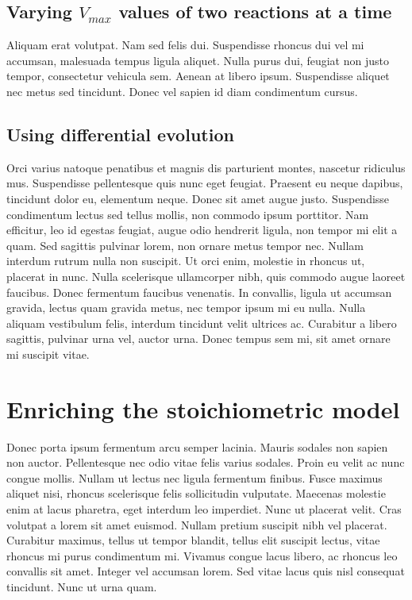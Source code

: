 \documentclass[parskip=full]{scrreprt}
\begin{document}
\section{Varying $V_{max}$ values of two reactions at a time}
\label{sec:couples}

Aliquam erat volutpat. Nam sed felis dui. Suspendisse rhoncus dui vel mi accumsan, malesuada tempus ligula aliquet. Nulla purus dui, feugiat non justo tempor, consectetur vehicula sem. Aenean at libero ipsum. Suspendisse aliquet nec metus sed tincidunt. Donec vel sapien id diam condimentum cursus.

\section{Using differential evolution}
\label{sec:de}

Orci varius natoque penatibus et magnis dis parturient montes, nascetur ridiculus mus. Suspendisse pellentesque quis nunc eget feugiat. Praesent eu neque dapibus, tincidunt dolor eu, elementum neque. Donec sit amet augue justo. Suspendisse condimentum lectus sed tellus mollis, non commodo ipsum porttitor. Nam efficitur, leo id egestas feugiat, augue odio hendrerit ligula, non tempor mi elit a quam. Sed sagittis pulvinar lorem, non ornare metus tempor nec. Nullam interdum rutrum nulla non suscipit. Ut orci enim, molestie in rhoncus ut, placerat in nunc. Nulla scelerisque ullamcorper nibh, quis commodo augue laoreet faucibus. Donec fermentum faucibus venenatis. In convallis, ligula ut accumsan gravida, lectus quam gravida metus, nec tempor ipsum mi eu nulla. Nulla aliquam vestibulum felis, interdum tincidunt velit ultrices ac. Curabitur a libero sagittis, pulvinar urna vel, auctor urna. Donec tempus sem mi, sit amet ornare mi suscipit vitae.

\chapter{Enriching the stoichiometric model}
\label{ch:stoich}

Donec porta ipsum fermentum arcu semper lacinia. Mauris sodales non sapien non auctor. Pellentesque nec odio vitae felis varius sodales. Proin eu velit ac nunc congue mollis. Nullam ut lectus nec ligula fermentum finibus. Fusce maximus aliquet nisi, rhoncus scelerisque felis sollicitudin vulputate. Maecenas molestie enim at lacus pharetra, eget interdum leo imperdiet. Nunc ut placerat velit. Cras volutpat a lorem sit amet euismod. Nullam pretium suscipit nibh vel placerat. Curabitur maximus, tellus ut tempor blandit, tellus elit suscipit lectus, vitae rhoncus mi purus condimentum mi. Vivamus congue lacus libero, ac rhoncus leo convallis sit amet. Integer vel accumsan lorem. Sed vitae lacus quis nisl consequat tincidunt. Nunc ut urna quam. 
\end{document}
